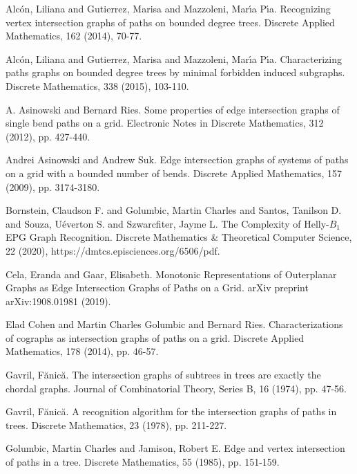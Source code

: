 \documentclass{dmgt}
\begin{document}
\begin{thebibliography}{99}

Alc{\'o}n, Liliana and Gutierrez, Marisa and Mazzoleni, Mar{\'\i}a P{\'\i}a. Recognizing vertex intersection graphs of paths on bounded degree trees. Discrete Applied Mathematics, 162 (2014), 70-77.

  Alc{\'o}n, Liliana and Gutierrez, Marisa and Mazzoleni, Mar{\'\i}a P{\'\i}a. Characterizing paths graphs on bounded degree trees by minimal forbidden induced subgraphs. Discrete Mathematics, 338 (2015), 103-110. 

A. Asinowski and Bernard Ries. Some properties of edge intersection graphs of single bend paths on a grid.  Electronic Notes in Discrete Mathematics, 312 (2012), pp. 427-440.

Andrei Asinowski and Andrew Suk. Edge intersection graphs of systems of paths on a grid with a bounded 	number of bends. Discrete Applied Mathematics, 157 (2009), pp. 3174-3180.

  Bornstein, Claudson F. and Golumbic, Martin Charles and Santos, Tanilson D. and Souza, Uéverton S. and Szwarcfiter, Jayme L. The Complexity of Helly-$B_{1}$ EPG Graph Recognition. Discrete Mathematics \& Theoretical Computer Science, 22 (2020), https://dmtcs.episciences.org/6506/pdf.

Cela, Eranda and Gaar, Elisabeth. Monotonic Representations of Outerplanar Graphs as Edge Intersection Graphs of Paths on a Grid. arXiv preprint arXiv:1908.01981 (2019).

Elad Cohen and Martin Charles Golumbic and Bernard Ries. Characterizations of cographs as intersection graphs of paths on a grid. Discrete Applied Mathematics, 178 (2014), pp. 46-57.

  Gavril, F{\u{a}}nic{\u{a}}. The intersection graphs of subtrees in trees are exactly the chordal graphs.  Journal of Combinatorial Theory, Series B, 16 (1974), pp. 47-56.

Gavril, F{\u{a}}nic{\u{a}}. A recognition algorithm for the intersection graphs of paths in trees. Discrete Mathematics, 23 (1978), pp. 211-227.

Golumbic, Martin Charles and Jamison, Robert E. Edge and vertex intersection of paths in a tree. Discrete Mathematics, 55 (1985), pp. 151-159.


\end{thebibliography}
\end{document}
